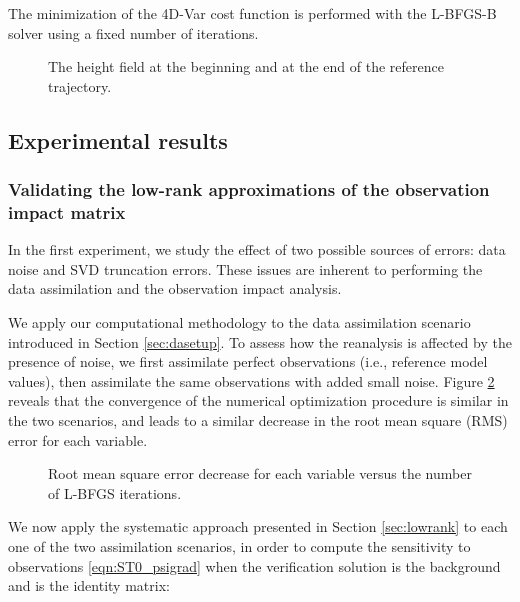 \documentclass[final,sort&compress]{elsarticle}
\begin{document}
The minimization of the 4D-Var cost function is performed with the L-BFGS-B solver \cite{zhu1997algorithm} using a fixed number of  iterations.

\begin{figure}
\centering
{}
\caption{The height field  at the beginning and at the end of the reference trajectory.}
\label{fig:swetraj}
\end{figure}


\subsection{Experimental results}


\subsubsection{Validating the low-rank approximations of the observation impact matrix}


In the first experiment, we study the effect of two possible sources of errors: data noise and SVD truncation errors.
These issues are inherent to performing the data assimilation and the observation impact analysis.

We apply our computational methodology to the data assimilation scenario introduced in Section \ref{sec:dasetup}. 
To assess how the reanalysis is affected by the presence of noise,
we first assimilate perfect observations (i.e., reference model values), then assimilate the same observations with added small noise. 
Figure \ref{fig:4dvar_perfvspert} reveals that the convergence of the numerical optimization procedure is similar in the two scenarios,
and leads to a similar decrease in the root mean square (RMS) error for each variable.



\begin{figure}
\setcounter{subfigure}{0}
\centering
\caption{Root mean square error decrease for each variable versus the number of L-BFGS iterations.}
 \label{fig:4dvar_perfvspert}
\end{figure}

We now apply the systematic approach presented in Section \ref{sec:lowrank} to each one of the two assimilation scenarios,
in order to compute the sensitivity to observations \eqref{eqn:ST0_psigrad}  when the verification solution  is 
the background  and  is the identity matrix:
\end{document}
